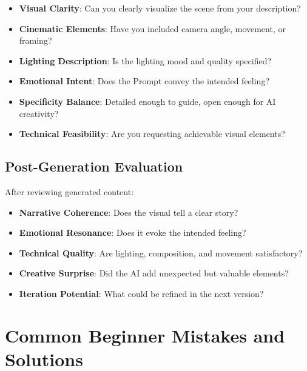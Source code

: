 \begin{itemize}
\item[$\square$] \textbf{Visual Clarity}: Can you clearly visualize the scene from your description?
\item[$\square$] \textbf{Cinematic Elements}: Have you included camera angle, movement, or framing?
\item[$\square$] \textbf{Lighting Description}: Is the lighting mood and quality specified?
\item[$\square$] \textbf{Emotional Intent}: Does the Prompt convey the intended feeling?
\item[$\square$] \textbf{Specificity Balance}: Detailed enough to guide, open enough for AI creativity?
\item[$\square$] \textbf{Technical Feasibility}: Are you requesting achievable visual elements?
\end{itemize}

\subsection*{Post-Generation Evaluation}
After reviewing generated content:

\begin{itemize}
\item[$\square$] \textbf{Narrative Coherence}: Does the visual tell a clear story?
\item[$\square$] \textbf{Emotional Resonance}: Does it evoke the intended feeling?
\item[$\square$] \textbf{Technical Quality}: Are lighting, composition, and movement satisfactory?
\item[$\square$] \textbf{Creative Surprise}: Did the AI add unexpected but valuable elements?
\item[$\square$] \textbf{Iteration Potential}: What could be refined in the next version?
\end{itemize}

\section*{Common Beginner Mistakes and Solutions}

